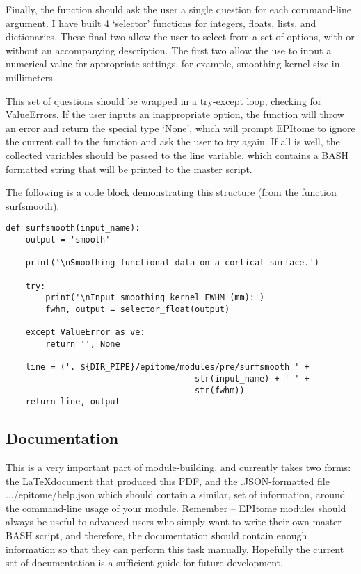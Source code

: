 \documentclass[final,titlepage,letterpaper,oneside,12pt]{article}
\renewcommand{\texttt}[2][BrickRed]{\textcolor{#1}{\ttfamily #2}}%
\begin{document}
Finally, the function should ask the user a single question for each command-line argument. I have built 4 `selector' functions for integers, floats, lists, and dictionaries. These final two allow the user to select from a set of options, with or without an accompanying description. The first two allow the use to input a numerical value for appropriate settings, for example, smoothing kernel size in millimeters.

This set of questions should be wrapped in a try-except loop, checking for ValueErrors. If the user inputs an inappropriate option, the function will throw an error and return the special type `None', which will prompt EPItome to ignore the current call to the function and ask the user to try again. If all is well, the collected variables should be passed to the \texttt{line} variable, which contains a BASH formatted string that will be printed to the master script.

The following is a code block demonstrating this structure (from the function \texttt{surfsmooth}).

\begin{lstlisting}
def surfsmooth(input_name):    
    output = 'smooth'

    print('\nSmoothing functional data on a cortical surface.')

    try:
        print('\nInput smoothing kernel FWHM (mm):')
        fwhm, output = selector_float(output)

    except ValueError as ve:
        return '', None

    line = ('. ${DIR_PIPE}/epitome/modules/pre/surfsmooth ' +
                                      str(input_name) + ' ' +
                                      str(fwhm))
    return line, output
\end{lstlisting}

\subsection{Documentation}

This is a very important part of module-building, and currently takes two forms: the \LaTeX document that produced this PDF, and the .JSON-formatted file \texttt{.../epitome/help.json} which should contain a similar, set of information, around the command-line usage of your module. Remember -- EPItome modules should always be useful to advanced users who simply want to write their own master BASH script, and therefore, the documentation should contain enough information so that they can perform this task manually. Hopefully the current set of documentation is a sufficient guide for future development.

\newpage 


\end{document}
